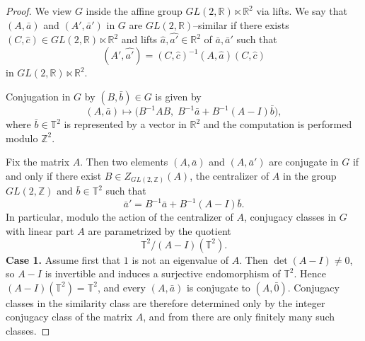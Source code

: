 \documentclass[12pt]{amsart}
\theoremstyle{plain}
\theoremstyle{definition}
\theoremstyle{remark}
\newcommand{\Z}{\mathbb Z}
\begin{document}
\begin{proof}
We view $G$ inside the affine group $GL(2,\mathbb R)\ltimes \mathbb R^2$
via lifts. We say that $(A,\bar a)$ and $(A',\bar a')$ in $G$ are
$GL(2,\mathbb R)$–similar if there exists $(C,\widehat{c})\in
GL(2,\mathbb R)\ltimes \mathbb R^2$ and lifts $\widehat{a},\widehat{a'}\in\mathbb R^2$ of
$\bar a,\bar a'$ such that
\[
(A',\widehat{a'}) = (C,\widehat{c})^{-1}(A,\widehat{a})(C,\widehat{c})
\]
in $GL(2,\mathbb R)\ltimes\mathbb R^2$.


Conjugation in $G$ by $(B,\bar b)\in G$ is given by
\[
(A,\bar a)\mapsto
\bigl(B^{-1}AB,\; B^{-1}\bar a + B^{-1}(A-I)\bar b\bigr),
\]
where $\bar b\in\mathbb T^2$ is represented by a vector in $\mathbb R^2$ and the
computation is performed modulo $\mathbb Z^2$.

Fix the matrix $A$. Then two elements $(A,\bar a)$ and $(A,\bar a')$ are conjugate in $G$
if and only if there exist $B\in Z_{GL(2,\mathbb Z)}(A)$, the centralizer of $A$ in the group $GL(2,\Z)$ and
$\bar b\in\mathbb T^2$ such that
\[
\bar a' = B^{-1}\bar a + B^{-1}(A-I)\bar b .
\]
In particular, modulo the action of the centralizer of $A$,
conjugacy classes in $G$ with linear part $A$ are parametrized by the quotient 
\[
\mathbb T^2 / (A-I)(\mathbb T^2).
\]
\noindent
\textbf{Case 1.} Assume first that $1$ is not an eigenvalue of $A$.
Then $\det(A-I)\neq 0$, so $A-I$ is invertible and induces
a surjective endomorphism of $\mathbb T^2$. Hence
$(A-I)(\mathbb T^2)=\mathbb T^2$, and every $(A,\bar a)$ is conjugate
to $(A,\bar 0)$. Conjugacy classes in the similarity class are therefore determined
only by the integer conjugacy class of the matrix $A$, and from \cite{ATW} there are only finitely many such classes.


\end{proof}
\end{document}
